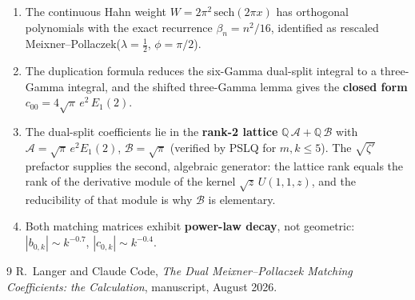\documentclass[11pt,a4paper]{article}
\newcommand{\Q}{\mathbb{Q}}
\begin{document}
\begin{enumerate}
\item The continuous Hahn weight $W = 2\pi^2\,\mathrm{sech}(2\pi x)$
has orthogonal polynomials with the exact recurrence
$\beta_n = n^2/16$, identified as rescaled
Meixner--Pollaczek($\lambda = \tfrac12$, $\phi = \pi/2$).

\item The duplication formula reduces the six-Gamma dual-split
integral to a three-Gamma integral, and the shifted three-Gamma lemma
gives the \textbf{closed form}
$c_{00} = 4\sqrt{\pi}\, e^2\, E_1(2)$.

\item The dual-split coefficients lie in the \textbf{rank-2 lattice}
$\Q\,\mathcal A + \Q\,\mathcal B$ with
$\mathcal A = \sqrt\pi\, e^2 E_1(2)$, $\mathcal B = \sqrt\pi$
(verified by PSLQ for $m,k \le 5$). The $\sqrt{\zeta'}$ prefactor
supplies the second, algebraic generator: the lattice rank equals
the rank of the derivative module of the kernel
$\sqrt z\, U(1,1,z)$, and the reducibility of that module is why
$\mathcal B$ is elementary.

\item Both matching matrices exhibit \textbf{power-law decay},
not geometric: $|b_{0,k}| \sim k^{-0.7}$,
$|c_{0,k}| \sim k^{-0.4}$.
\end{enumerate}

\begin{thebibliography}{9}
R.~Langer and Claude Code,
\emph{The Dual Meixner--Pollaczek Matching Coefficients: the Calculation},
manuscript, August 2026.
\end{thebibliography}
\end{document}
